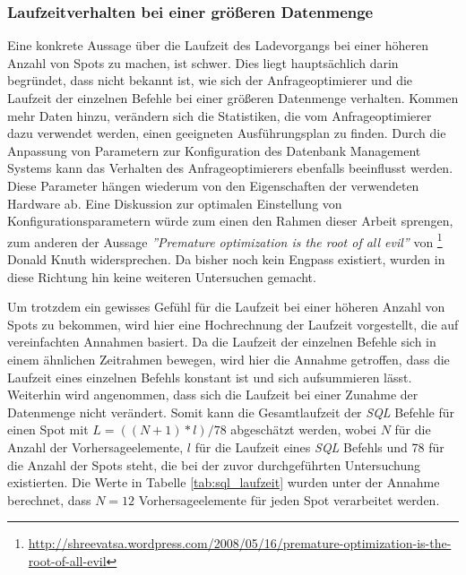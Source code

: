 \subsubsection{Laufzeitverhalten bei einer größeren Datenmenge}
Eine konkrete Aussage über die Laufzeit des Ladevorgangs bei einer
höheren Anzahl von Spots zu machen, ist schwer. Dies liegt
hauptsächlich darin begründet, dass nicht bekannt ist, wie sich der
Anfrageoptimierer und die Laufzeit der einzelnen Befehle bei einer
größeren Datenmenge verhalten. Kommen mehr Daten hinzu, verändern sich
die Statistiken, die vom Anfrageoptimierer dazu verwendet werden,
einen geeigneten Ausführungsplan zu finden. Durch die Anpassung von
Parametern zur Konfiguration des Datenbank Management Systems kann das
Verhalten des Anfrageoptimierers ebenfalls beeinflusst werden. Diese
Parameter hängen wiederum von den Eigenschaften der verwendeten
Hardware ab. Eine Diskussion zur optimalen Einstellung von
Konfigurationsparametern würde zum einen den Rahmen dieser Arbeit
sprengen, zum anderen der Aussage \textit{''Premature optimization is
  the root of all evil''} von
\footnote{\url{http://shreevatsa.wordpress.com/2008/05/16/premature-optimization-is-the-root-of-all-evil}}
Donald Knuth widersprechen. Da bisher noch kein Engpass existiert,
wurden in diese Richtung hin keine weiteren Untersuchen gemacht.

Um trotzdem ein gewisses Gefühl für die Laufzeit bei einer höheren
Anzahl von Spots zu bekommen, wird hier eine Hochrechnung der Laufzeit
vorgestellt, die auf vereinfachten Annahmen basiert. Da die Laufzeit
der einzelnen Befehle sich in einem ähnlichen Zeitrahmen bewegen, wird
hier die Annahme getroffen, dass die Laufzeit eines einzelnen Befehls
konstant ist und sich aufsummieren lässt. Weiterhin wird angenommen,
dass sich die Laufzeit bei einer Zunahme der Datenmenge nicht
verändert. Somit kann die Gesamtlaufzeit der \textit{SQL} Befehle für
einen Spot mit $L = ((N+1) * l) / 78$ abgeschätzt werden, wobei $N$
für die Anzahl der Vorhersageelemente, $l$ für die Laufzeit eines
\textit{SQL} Befehls und 78 für die Anzahl der Spots steht, die bei
der zuvor durchgeführten Untersuchung existierten. Die Werte in
Tabelle \ref{tab:sql_laufzeit} wurden unter der Annahme berechnet,
dass $N=12$ Vorhersageelemente für jeden Spot verarbeitet werden.

